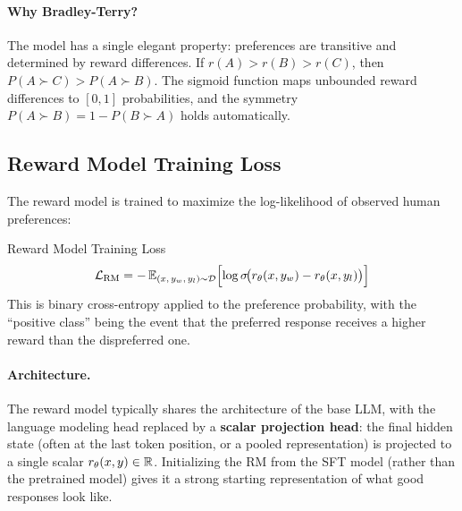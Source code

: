 \paragraph{Why Bradley-Terry?}
The model has a single elegant property: preferences are transitive and
determined by reward differences.  If $r(A) > r(B) > r(C)$, then
$P(A \succ C) > P(A \succ B)$.  The sigmoid function maps unbounded reward
differences to $[0, 1]$ probabilities, and the symmetry
$P(A \succ B) = 1 - P(B \succ A)$ holds automatically.

\subsection{Reward Model Training Loss}

The reward model is trained to maximize the log-likelihood of observed human
preferences:

\begin{mathresult}{Reward Model Training Loss}
\begin{equation}
\mathcal{L}_{\text{RM}} = -\operatorname{\mathbb{E}}_{(x,\, y_w,\, y_l) \sim \mathcal{D}}
\Bigl[\log \sigma\!\bigl(r_\theta(x, y_w) - r_\theta(x, y_l)\bigr)\Bigr]
\label{eq:rm_loss}
\end{equation}
This is binary cross-entropy applied to the preference probability, with the
``positive class'' being the event that the preferred response receives a
higher reward than the dispreferred one.
\end{mathresult}

\paragraph{Architecture.}
The reward model typically shares the architecture of the base LLM, with the
language modeling head replaced by a \textbf{scalar projection head}: the
final hidden state (often at the last token position, or a pooled
representation) is projected to a single scalar $r_\theta(x, y) \in \mathbb{R}$.
Initializing the RM from the SFT model (rather than the pretrained model)
gives it a strong starting representation of what good responses look like.

